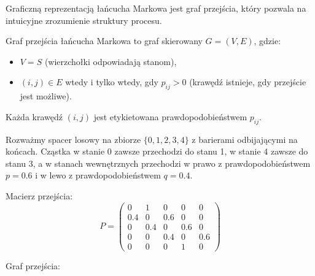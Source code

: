 \documentclass[final,a4paper,openany,12pt]{mwbk}
\begin{document}
Graficzną reprezentacją łańcucha Markowa jest graf przejścia, który pozwala na intuicyjne zrozumienie struktury procesu.

\begin{Def}
Graf przejścia łańcucha Markowa to graf skierowany $G = (V, E)$, gdzie:
\begin{itemize}
    \item $V = S$ (wierzchołki odpowiadają stanom),
    \item $(i, j) \in E$ wtedy i tylko wtedy, gdy $p_{ij} > 0$ (krawędź istnieje, gdy przejście jest możliwe).
\end{itemize}
Każda krawędź $(i, j)$ jest etykietowana prawdopodobieństwem $p_{ij}$.
\end{Def}


\begin{Prz}
Rozważmy spacer losowy na zbiorze $\{0, 1, 2, 3, 4\}$ z barierami odbijającymi na końcach. Cząstka w stanie 0 zawsze przechodzi do stanu 1, w stanie 4 zawsze do stanu 3, a w stanach wewnętrznych przechodzi w prawo z prawdopodobieństwem $p = 0.6$ i w lewo z prawdopodobieństwem $q = 0.4$.

Macierz przejścia:
$$P = \begin{pmatrix}
0 & 1 & 0 & 0 & 0 \\
0.4 & 0 & 0.6 & 0 & 0 \\
0 & 0.4 & 0 & 0.6 & 0 \\
0 & 0 & 0.4 & 0 & 0.6 \\
0 & 0 & 0 & 1 & 0
\end{pmatrix}$$

Graf przejścia:

\begin{center}
\end{center}
\end{Prz}




\printbibliography
\end{document}

